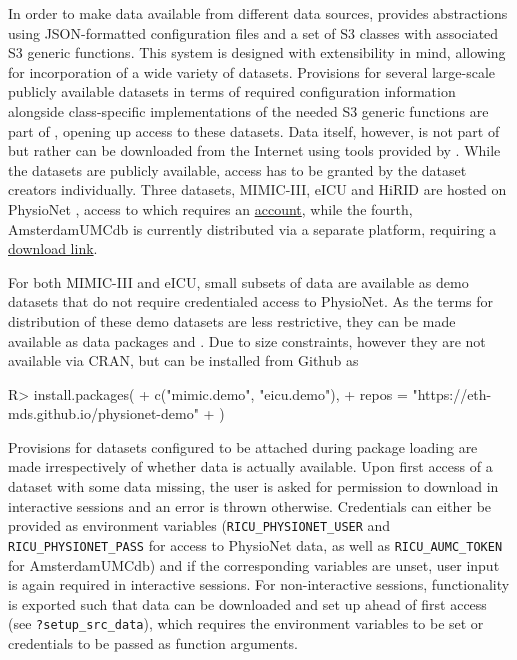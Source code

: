 \documentclass[
  notitle]{jss}
\begin{document}
In order to make data available from different data sources, 
provides abstractions using JSON-formatted configuration files and a set
of S3 classes with associated S3 generic functions. This system is
designed with extensibility in mind, allowing for incorporation of a
wide variety of datasets. Provisions for several large-scale publicly
available datasets in terms of required configuration information
alongside class-specific implementations of the needed S3 generic
functions are part of , opening up access to these datasets.
Data itself, however, is not part of  but rather can be
downloaded from the Internet using tools provided by . While
the datasets are publicly available, access has to be granted by the
dataset creators individually. Three datasets, MIMIC-III, eICU and HiRID
are hosted on PhysioNet \citep{goldberger2000}, access to which requires
an \href{https://physionet.org/register/}{account}, while the fourth,
AmsterdamUMCdb is currently distributed via a separate platform,
requiring a
\href{https://amsterdammedicaldatascience.nl/\#amsterdamumcdb}{download
link}.

For both MIMIC-III and eICU, small subsets of data are available as demo
datasets that do not require credentialed access to PhysioNet. As the
terms for distribution of these demo datasets are less restrictive, they
can be made available as data packages  and
. Due to size constraints, however they are not available
via CRAN, but can be installed from Github as

\begin{CodeChunk}
\begin{CodeInput}
R> install.packages(
+   c("mimic.demo", "eicu.demo"),
+   repos = "https://eth-mds.github.io/physionet-demo"
+ )
\end{CodeInput}
\end{CodeChunk}

Provisions for datasets configured to be attached during package loading
are made irrespectively of whether data is actually available. Upon
first access of a dataset with some data missing, the user is asked for
permission to download in interactive sessions and an error is thrown
otherwise. Credentials can either be provided as environment variables
(\texttt{RICU\_PHYSIONET\_USER} and \texttt{RICU\_PHYSIONET\_PASS} for
access to PhysioNet data, as well as \texttt{RICU\_AUMC\_TOKEN} for
AmsterdamUMCdb) and if the corresponding variables are unset, user input
is again required in interactive sessions. For non-interactive sessions,
functionality is exported such that data can be downloaded and set up
ahead of first access (see \texttt{?setup\_src\_data}), which requires
the environment variables to be set or credentials to be passed as
function arguments.
\end{document}
